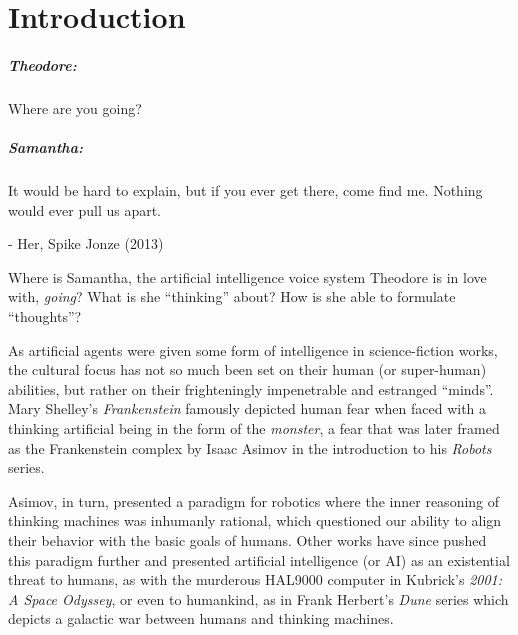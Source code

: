 \chapter{Introduction}
\label{intro}
\begin{center}
  \begin{minipage}{0.7\textwidth}
    \begin{small}
      \paragraph{Theodore:} Where are you going?
      \paragraph{Samantha:} It would be hard to explain, but if you ever get there, come find me. Nothing would ever pull us apart. 
    \end{small}
    \begin{flushright}- Her, Spike Jonze (2013) \end{flushright}

  \end{minipage}
\end{center}

Where is Samantha, the artificial intelligence voice system Theodore is in love with, \textit{going}? What is she ``thinking'' about? How is she able to formulate ``thoughts''?

As artificial agents were given some form of intelligence in science-fiction works, the cultural focus has not so much been set on their human (or super-human) abilities, but rather on their frighteningly impenetrable and estranged ``minds''. Mary Shelley's \textit{Frankenstein} famously depicted human fear when faced with a thinking artificial being in the form of the \textit{monster}, a fear that was later framed as the Frankenstein complex by Isaac Asimov in the introduction to his \textit{Robots} series.

Asimov, in turn, presented a paradigm for robotics where the inner reasoning of thinking machines was inhumanly rational, which questioned our ability to align their behavior with the basic goals of humans. Other works have since pushed this paradigm further and presented artificial intelligence (or AI) as an existential threat to humans, as with the murderous HAL9000 computer in Kubrick's \textit{2001: A Space Odyssey}, or even to humankind, as in Frank Herbert's \textit{Dune} series which depicts a galactic war between humans and thinking machines.

